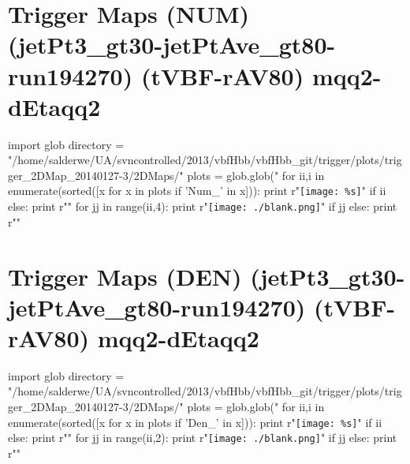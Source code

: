\documentclass[12pt,english,dvipsnames]{beamer}
\newcommand{\UAoverlay}[0]{%
\begin{tikzpicture}[remember picture,overlay,shift={(current page.north east)}]
\node (zero) at (-1.8cm,-0.93cm) {\texttt{[image: ../logos/CMS.pdf]}\hspace{0.15cm}\texttt{[image: ../logos/CERN.pdf]}\hspace{0.15cm}\texttt{[image: ../logos/UA.pdf]}}; 
\end{tikzpicture}
}
\begin{document}
\section{Trigger Maps (NUM) (jetPt3\_gt30-jetPtAve\_gt80-run194270) (tVBF-rAV80) mqq2-dEtaqq2}
\begin{frame}[t,fragile]%
\begin{python}
import glob
directory = "/home/salderwe/UA/svncontrolled/2013/vbfHbb/vbfHbb_git/trigger/plots/trigger_2DMap_20140127-3/2DMaps/"
plots = glob.glob("%
for ii,i in enumerate(sorted([x for x in plots if 'Num_' in x])):
  print r"\texttt{[image: \%s]}"%
  if ii%
  else: print r"\hfill"
for jj in range(ii,4):
  print r"\texttt{[image: ./blank.png]}"
  if jj%
  else: print r"\hfill"
\end{python} 
\end{frame}
\section{Trigger Maps (DEN) (jetPt3\_gt30-jetPtAve\_gt80-run194270) (tVBF-rAV80) mqq2-dEtaqq2}
\begin{frame}[t,fragile]%
\begin{python}
import glob
directory = "/home/salderwe/UA/svncontrolled/2013/vbfHbb/vbfHbb_git/trigger/plots/trigger_2DMap_20140127-3/2DMaps/"
plots = glob.glob("%
for ii,i in enumerate(sorted([x for x in plots if 'Den_' in x])):
  print r"\texttt{[image: \%s]}"%
  if ii%
  else: print r"\hfill"
for jj in range(ii,2):
  print r"\texttt{[image: ./blank.png]}"
  if jj%
  else: print r"\hfill"
\end{python} 
\end{frame}
\end{document}

